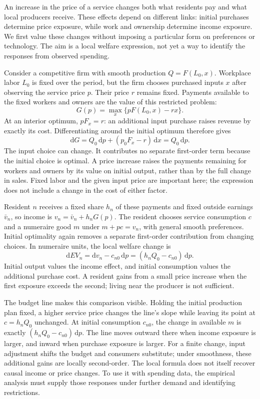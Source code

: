 An increase in the price of a service changes both what residents pay and what
local producers receive. These effects depend on different links: initial purchases
determine price exposure, while work and ownership determine income exposure.
We first value these changes without imposing a particular form on preferences
or technology. The aim is a local welfare expression, not yet a way to identify
the responses from observed spending.

Consider a competitive firm with smooth production $Q=F(L_0,x)$. Workplace labor
$L_0$ is fixed over the period, but the firm chooses purchased inputs $x$ after
observing the service price $p$. Their price $r$ remains fixed. Payments available
to the fixed workers and owners are the value of this restricted problem:
\[
G(p)=\max_x\{pF(L_0,x)-rx\}.
\]
At an interior optimum, $pF_x=r$: an additional input purchase raises revenue
by exactly its cost. Differentiating around the initial optimum therefore gives
\[
\mathrm dG=Q_0\,\mathrm dp+(p_0F_x-r)\,\mathrm dx=Q_0\,\mathrm dp.
\]
The input choice can change. It contributes no separate first-order term because
the initial choice is optimal. A price increase raises the payments remaining for
workers and owners by its value on initial output, rather than by the full change
in sales. Fixed labor and the given input price are important here; the expression
does not include a change in the cost of either factor.

Resident $n$ receives a fixed share $h_n$ of these payments and fixed outside
earnings $\bar v_n$, so income is $v_n=\bar v_n+h_nG(p)$. The resident chooses
service consumption $c$ and a numeraire good $m$ under $m+pc=v_n$, with general
smooth preferences. Initial optimality again removes a separate first-order
contribution from changing choices. In numeraire units, the local welfare change is
\[
\mathrm dEV_n=\mathrm dv_n-c_{n0}\,\mathrm dp
             =(h_nQ_0-c_{n0})\,\mathrm dp.
\]
Initial output values the income effect, and initial consumption values the
additional purchase cost. A resident gains from a small price increase when the
first exposure exceeds the second; living near the producer is not sufficient.

The budget line makes this comparison visible. Holding the initial production
plan fixed, a higher service price changes the line's slope while leaving its
point at $c=h_nQ_0$ unchanged. At initial consumption $c_{n0}$, the change in
available $m$ is exactly $(h_nQ_0-c_{n0})\,\mathrm dp$. The line moves outward
there when income exposure is larger, and inward when purchase exposure is larger.
For a finite change, input adjustment shifts the budget and consumers substitute;
under smoothness, these additional gains are locally second-order. The local
formula does not itself recover causal income or price changes. To use it with
spending data, the empirical analysis must supply those responses under further
demand and identifying restrictions.
